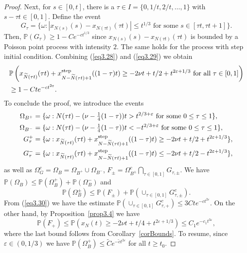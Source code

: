 \documentclass[12pt,a4paper]{article}
\numberwithin{equation}{section}
\newcommand{\Pb}{\mathbb{P}}
\newcommand{\e}{\varepsilon}
\begin{document}
\begin{proof}
Next, for $s\in [0,t]$, there is a $\tau \in I=\{0,1/t,2/t,\ldots,1\}$ with $s-\tau t\in [0,1]$. Define the event
\begin{equation}\label{eq3.29}
G_\tau=\{\omega: |x_{N(s)}(s)-x_{N(\tau t)}(\tau t)|\leq t^{1/3}\textrm{ for some }s\in[\tau t,\tau t+1]\}.
\end{equation}
Then, $\Pb(G_\tau)\geq 1-C e^{-c t^{1/3}}$ since $x_{N(s)}(s)-x_{N(\tau t)}(\tau t)$ is bounded by a Poisson point process with intensity $2$. The same holds for the process with step initial condition. Combining (\ref{eq3.28}) and (\ref{eq3.29}) we obtain
\begin{equation}\label{eq3.30}
\begin{aligned}
&\Pb\left(x_{\widetilde N(\tau t)}(\tau t)+x^{\rm step}_{N-\widetilde N(\tau t)+1}((1-\tau) t)\geq -2\nu t+t/2+ t^{2\e+1/3}\textrm{ for all }\tau\in[0,1]\right)\\
&\geq 1-C t e^{-c t^{2\e}}.
\end{aligned}
\end{equation}
%
To conclude the proof, we introduce the events
\begin{equation}
\begin{aligned}
\Omega_{B^+}&=\{\omega: N(\tau t)-(\nu-\tfrac14 (1-\tau))t>t^{2/3+\e}\textrm{ for some }0\leq \tau\leq 1\},\\
\Omega_{B^-}&=\{\omega: N(\tau t)-(\nu-\tfrac14 (1-\tau))t<-t^{2/3+\e}\textrm{ for some }0\leq \tau\leq 1\},\\
G^+_\tau&=\{\omega: x_{\widetilde N(\tau t)}(\tau t)+x^{\rm step}_{N-\widetilde N(\tau t)+1}((1-\tau) t)\geq -2\nu t+t/2+ t^{2\e+1/3}\},\\
G^-_\tau&=\{\omega: x_{\widetilde N(\tau t)}(\tau t)+x^{\rm step}_{N-\widetilde N(\tau t)+1}((1-\tau) t)\leq -2\nu t+t/2-t^{2\e+1/3}\},
\end{aligned}
\end{equation}
as well as $\Omega_G^c=\Omega_B=\Omega_{B^+}\cup\Omega_{B^-}$, $F_\pm=\Omega_{B^\pm}^c\bigcap_{\tau\in [0,1]}G_{\tau,\pm}$. We have $\Pb(\Omega_B)\leq \Pb(\Omega_B^+)+\Pb(\Omega_B^-)$ and
\begin{equation}
\Pb(\Omega_B^\pm)\leq \Pb(F_\pm)+\Pb(\cup_{\tau\in[0,1]}G_{\tau,\pm}^c).
\end{equation}
From (\ref{eq3.30}) we have the estimate $\Pb(\cup_{\tau\in[0,1]}G_{\tau,+}^c)\leq 3C t e^{-c t^{2\e}}$. On the other hand, by Proposition~\ref{prop3.4} we have
\begin{equation}
\Pb(F_+) \leq \Pb(x_N(t)\geq -2\nu t+t/4+t^{2\e+1/3})\leq C_1 e^{-c_1 t^{3\e}},
\end{equation}
where the last bound follows from Corollary~\ref{corBounds}. To resume, since $\e\in (0,1/3)$ we have $\Pb(\Omega_B^+)\leq \tilde C e^{-\tilde c t^{2\e}}$ for all $t\geq t_0$.


\end{proof}
\end{document}
